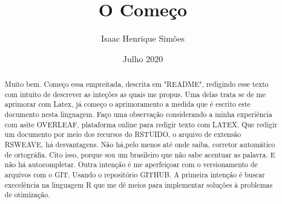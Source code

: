 \documentclass[12pt,twoside]{article}
\title{O Começo}
\author{Isaac Henrique Simões}
\date{Julho 2020}
\begin{document}


  \maketitle

\begin{abstract}
Muito bem. Começo essa empreitada, descrita em "README", redigindo esse texto com intuito de descrever as inteções as quais me propus. Uma delas trata se de me aprimorar com Latex, já começo o aprimoramento a medida que é escrito este documento nesta linguagem. Faço uma observação considerando a minha experiência com asite OVERLEAF, plataforma online para redigir texto com LATEX. Que redigir um documento por meio dos recursos do RSTUIDO, o arquivo de extensão RSWEAVE, há  desvantagens. Não há,pelo menos até onde saiba, corretor automático de ortográfia. Cito isso, porque sou um brasileiro que não sabe acentuar as palavra. E não há autocompletar.
Outra intenção é me aperfeiçoar com o versionamento de arquivos com o GIT. Usando o repositório GITHUB. 
A primeira intenção é buscar execelência na linguagem R que me dê meios para implementar soluções à problemas de otimização.
\end{abstract}
\end{document}
